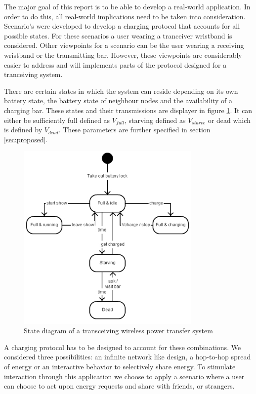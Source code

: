 The major goal of this report is to be able to develop a real-world application. In order to do this, all real-world implications need to be taken into consideration. Scenario's were developed to develop a charging protocol that accounts for all possible states. For these scenarios a user wearing a tranceiver wristband is considered. Other viewpoints for a scenario can be the user wearing a receiving wristband or the transmitting bar. However, these viewpoints are considerably easier to address and will implements parts of the protocol designed for a tranceiving system.

There are certain states in which the system can reside depending on its own battery state, the battery state of neighbour nodes and the availability of a charging bar. These states and their transmissions are displayer in figure \ref{fig:states}. It can either be sufficiently full defined as $V_{full}$, starving defined as $V_{starve}$ or dead which is defined by $V_{dead}$. These parameters are further specified in section \ref{sec:proposed}.

\begin{figure}[h!]
\centering
\includegraphics[width=0.8\textwidth]{statediagram.pdf}
\caption{State diagram of a transceiving wireless power transfer system}
\label{fig:states}
\end{figure}

A charging protocol has to be designed to account for these combinations. We considered three possibilities: an infinite network like design, a hop-to-hop spread of energy or an interactive behavior to selectively share energy. To stimulate interaction through this application we choose to apply a scenario where a user can choose to act upon energy requests and share with friends, or strangers.

